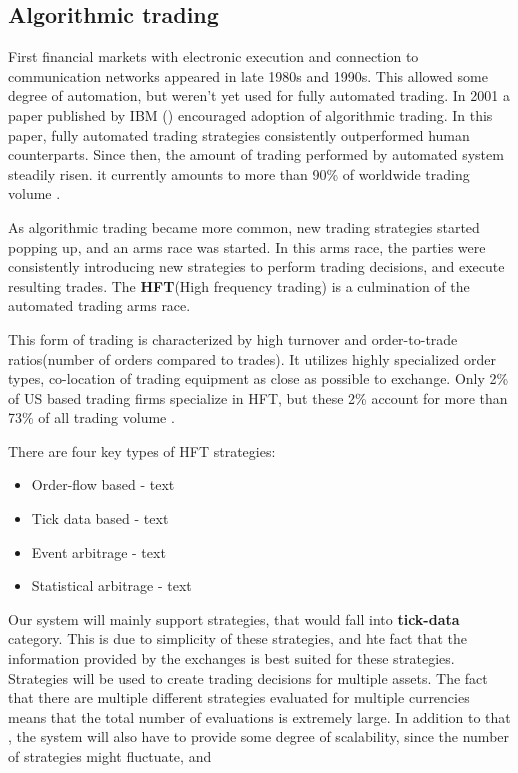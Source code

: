 \subsection{Algorithmic trading}
First financial markets with electronic execution and connection to communication networks appeared
in late 1980s and 1990s. This allowed some degree of automation, but weren't yet used for fully
automated trading. In 2001 a paper published by IBM ()
encouraged adoption of algorithmic trading. In this paper, fully automated trading strategies
consistently outperformed human counterparts. Since then, the amount of trading performed by
automated system steadily risen. it currently amounts to more than 90\% of worldwide
trading volume .

As algorithmic trading became more common, new trading strategies started popping up, and
an arms race was started. In this arms race, the parties were consistently introducing new
strategies to perform trading decisions, and execute resulting trades. The \textbf{HFT}(High frequency trading)
is a culmination of the automated trading arms race.

This form of trading is characterized by high turnover and order-to-trade ratios(number of orders compared to trades).
It utilizes highly specialized order types, co-location of trading equipment as close as possible to exchange.
Only 2\% of US based trading firms specialize in HFT, but these 2\% account for more than 73\% of all
trading volume .

There are four key types of HFT strategies:
\begin{itemize}
    \item {Order-flow based - text }
    \item {Tick data based - text }
    \item {Event arbitrage - text}
    \item {Statistical arbitrage - text }
\end{itemize}



Our system will mainly support strategies, that would fall into \textbf{tick-data} category. This is due
to simplicity of these strategies, and hte fact that the information provided by the exchanges is best suited
for these strategies. Strategies will be used to create trading decisions for multiple assets. The fact that
there are multiple different strategies evaluated for multiple currencies means that the total number of evaluations is
extremely large. In addition to that , the system will also have to provide some degree of scalability, since the number of strategies might
fluctuate, and

